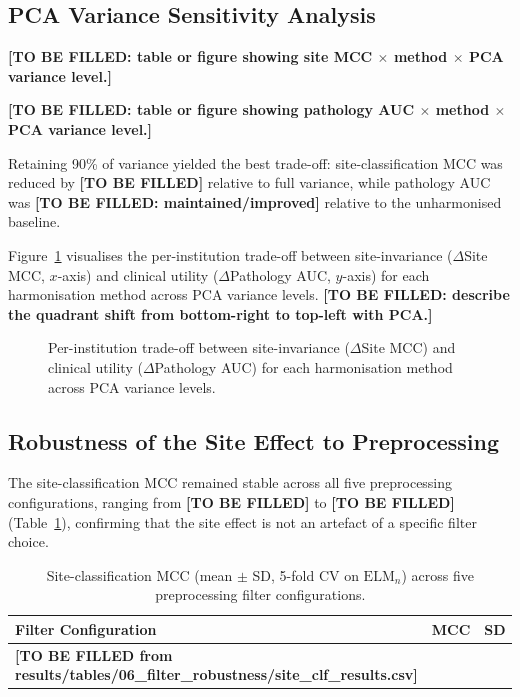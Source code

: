 \documentclass[preprint,12pt]{elsarticle}
\begin{document}
\subsection{PCA Variance Sensitivity Analysis}
\label{subsec:pca_sweep}

\textbf{[TO BE FILLED: table or figure showing site MCC $\times$
method $\times$ PCA variance level.]}

\textbf{[TO BE FILLED: table or figure showing pathology AUC
$\times$ method $\times$ PCA variance level.]}

Retaining 90\% of variance yielded the best trade-off:
site-classification MCC was reduced by \textbf{[TO BE FILLED]}
relative to full variance, while pathology AUC was
\textbf{[TO BE FILLED: maintained/improved]} relative to the
unharmonised baseline.

Figure~\ref{fig:tradeoff} visualises the per-institution trade-off
between site-invariance ($\Delta$Site MCC, $x$-axis) and clinical
utility ($\Delta$Pathology AUC, $y$-axis) for each harmonisation
method across PCA variance levels.
\textbf{[TO BE FILLED: describe the quadrant shift from bottom-right
to top-left with PCA.]}

\begin{figure}[htbp]
  \centering
  \caption{Per-institution trade-off between site-invariance
    ($\Delta$Site MCC) and clinical utility ($\Delta$Pathology AUC)
    for each harmonisation method across PCA variance levels.}
  \label{fig:tradeoff}
\end{figure}

\subsection{Robustness of the Site Effect to Preprocessing}
\label{subsec:filter_robustness}

The site-classification MCC remained stable across all five
preprocessing configurations, ranging from \textbf{[TO BE FILLED]}
to \textbf{[TO BE FILLED]}
(Table~\ref{tab:filter_robustness}), confirming that the site effect
is not an artefact of a specific filter choice.

\begin{table}[htbp]
  \centering
  \caption{Site-classification MCC (mean $\pm$ SD, 5-fold CV on
    $\mathrm{ELM}_n$) across five preprocessing filter
    configurations.}
  \label{tab:filter_robustness}
  \begin{tabular}{lcc}
    \toprule
    \textbf{Filter Configuration} & \textbf{MCC} & \textbf{SD} \\
    \midrule
    \textbf{[TO BE FILLED from
      results/tables/06\_filter\_robustness/site\_clf\_results.csv]} \\
    \bottomrule
  \end{tabular}
\end{table}
\end{document}
